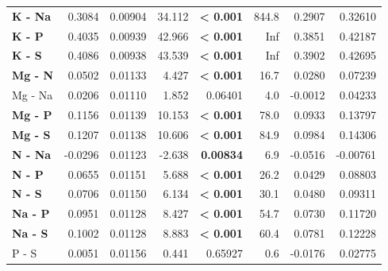 \begin{table}[H]
\begin{tabular}[t]{>{}lrrr>{}rrrr}
\textbf{K - Na} & 0.3084 & 0.00904 & 34.112 & \textbf{< 0.001} & 844.8 & 0.2907 & 0.32610\\
\textbf{K - P} & 0.4035 & 0.00939 & 42.966 & \textbf{< 0.001} & Inf & 0.3851 & 0.42187\\
\textbf{K - S} & 0.4086 & 0.00938 & 43.539 & \textbf{< 0.001} & Inf & 0.3902 & 0.42695\\
\textbf{Mg - N} & 0.0502 & 0.01133 & 4.427 & \textbf{< 0.001} & 16.7 & 0.0280 & 0.07239\\
Mg - Na & 0.0206 & 0.01110 & 1.852 & 0.06401 & 4.0 & -0.0012 & 0.04233\\
\textbf{Mg - P} & 0.1156 & 0.01139 & 10.153 & \textbf{< 0.001} & 78.0 & 0.0933 & 0.13797\\
\textbf{Mg - S} & 0.1207 & 0.01138 & 10.606 & \textbf{< 0.001} & 84.9 & 0.0984 & 0.14306\\
\textbf{N - Na} & -0.0296 & 0.01123 & -2.638 & \textbf{0.00834} & 6.9 & -0.0516 & -0.00761\\
\textbf{N - P} & 0.0655 & 0.01151 & 5.688 & \textbf{< 0.001} & 26.2 & 0.0429 & 0.08803\\
\textbf{N - S} & 0.0706 & 0.01150 & 6.134 & \textbf{< 0.001} & 30.1 & 0.0480 & 0.09311\\
\textbf{Na - P} & 0.0951 & 0.01128 & 8.427 & \textbf{< 0.001} & 54.7 & 0.0730 & 0.11720\\
\textbf{Na - S} & 0.1002 & 0.01128 & 8.883 & \textbf{< 0.001} & 60.4 & 0.0781 & 0.12228\\
P - S & 0.0051 & 0.01156 & 0.441 & 0.65927 & 0.6 & -0.0176 & 0.02775\\
\bottomrule
\end{tabular}
\end{table}
